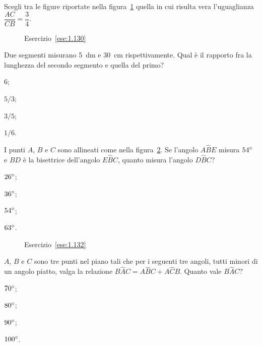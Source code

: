 	
\begin{esercizio}
\label{ese:1.130}
Scegli tra le figure riportate nella figura~\ref{fig:ese1.130} quella in cui risulta vera l'uguaglianza $\dfrac{AC}{CB}=\dfrac{3}{4}$.
\end{esercizio}

\begin{figure}[htb]
 \centering
 \caption{Esercizio~\ref{ese:1.130}}\label{fig:ese1.130}
\end{figure}

\begin{esercizio}
\label{ese:1.131}
Due segmenti misurano 5~dm e 30~cm rispettivamente. Qual è il rapporto fra la lunghezza del secondo segmento e quella del primo?
\begin{multicols}{4}
\begin{enumeratea}
\item 6;
\item $5/3$;
\item $3/5$;
\item $1/6$.
\end{enumeratea}
\end{multicols}
\end{esercizio}

\begin{esercizio}
\label{ese:1.132}
I punti $A$, $B$ e $C$ sono allineati come nella figura~\ref{fig:ese1.132}. Se l'angolo $A\widehat{B}E$ misura $54{}^{\circ}$ e $BD$ è la bisettrice dell'angolo $E\widehat{B}C$, quanto misura l'angolo $D\widehat{B}C$?
\begin{multicols}{4}
\begin{enumeratea}
\item $26{}^{\circ}$;
\item $36{}^{\circ}$;
\item $54{}^{\circ}$;
\item $63{}^{\circ}$.
\end{enumeratea}
\end{multicols}
\end{esercizio}

\begin{figure}[htb]
 \centering
 \caption{Esercizio~\ref{ese:1.132}}\label{fig:ese1.132}
\end{figure}

\pagebreak

\begin{esercizio}
\label{ese:1.133}
$A$, $B$ e $C$ sono tre punti nel piano tali che per i seguenti tre angoli, tutti minori di un angolo piatto, valga la relazione $B\widehat{A}C=A\widehat{B}C+A\widehat{C}B$. Quanto vale $B\widehat{A}C$?
\begin{multicols}{4}
\begin{enumeratea}
\item $70{}^{\circ}$;
\item $80{}^{\circ}$;
\item $90{}^{\circ}$;
\item $100{}^{\circ}$.
\end{enumeratea}
\end{multicols}
\end{esercizio}

